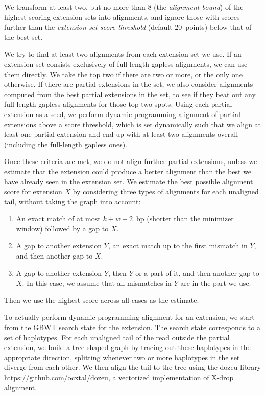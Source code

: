 \documentclass[11pt]{ucscthesis}
\newcommand{\param}[1]{\emph{#1}}
\begin{document}
We transform at least two, but no more than 8 (the \param{alignment bound}) of the highest-scoring extension sets into alignments, and ignore those with scores further than the \param{extension set score threshold} (default 20~points) below that of the best set.

We try to find at least two alignments from each extension set we use.
If an extension set consists exclusively of full-length gapless alignments, we can use them directly. We take the top two if there are two or more, or the only one otherwise.
If there are partial extensions in the set, we also consider alignments computed from the best partial extensions in the set, to see if they beat out any full-length gapless alignments for those top two spots.
Using each partial extension as a seed, we perform dynamic programming alignment of partial extensions above a score threshold, which is set dynamically such that we align at least one partial extension and end up with at least two alignments overall (including the full-length gapless ones).

Once these criteria are met, we do not align further partial extensions, unless we estimate that the extension could produce a better alignment than the best we have already seen in the extension set.
We estimate the best possible alignment score for extension $X$ by considering three types of alignments for each unaligned tail, without taking the graph into account:
\begin{enumerate}
\item An exact match of at most $k + w - 2$~bp (shorter than the minimizer window) followed by a gap to $X$.
\item A gap to another extension $Y$, an exact match up to the first mismatch in $Y$, and then another gap to $X$.
\item A gap to another extension $Y$, then $Y$ or a part of it, and then another gap to $X$. In this case, we assume that all mismatches in $Y$ are in the part we use.
\end{enumerate}
Then we use the highest score across all cases as the estimate.

To actually perform dynamic programming alignment for an extension, we start from the GBWT search state for the extension.
The search state corresponds to a set of haplotypes.
For each unaligned tail of the read outside the partial extension, we build a tree-shaped graph by tracing out these haplotypes in the appropriate direction, splitting whenever two or more haplotypes in the set diverge from each other.
We then align the tail to the tree using the dozeu library \url{https://github.com/ocxtal/dozeu}, a vectorized implementation of X-drop alignment.
\end{document}
